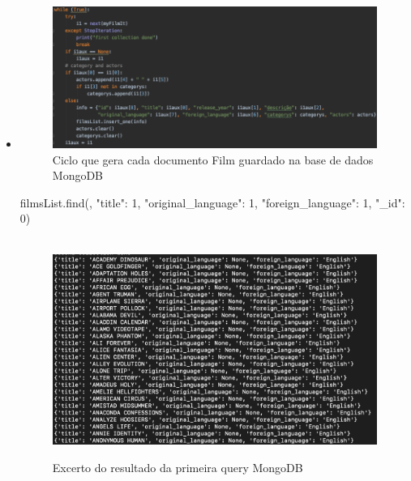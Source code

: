 \begin{itemize}
\item \begin{figure}[H]

  \centering

  \includegraphics[scale = 0.40]{ciclo.png}

  \caption {Ciclo que gera cada documento Film guardado na base de dados MongoDB}

  \label {fig1}

\end{figure}filmsList.find({}, {"title": 1, "original\_language": 1, "foreign\_language": 1, "\_id": 0})

\begin{figure}[H]

  \centering

  \hbox{\hspace{-11.5em} \includegraphics[scale = 0.45]{mongoQuery1.png}}

  \caption {Excerto do resultado da primeira query MongoDB}

  \label {fig2}

\end{figure}

\end{itemize}